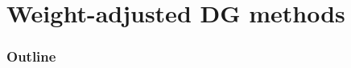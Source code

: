 \documentclass[compress]{beamer}
\begin{document}
%
%

\section{Weight-adjusted DG methods}

\begin{frame}[noframenumbering]
    \frametitle{Outline}
\end{frame}
\end{document}
